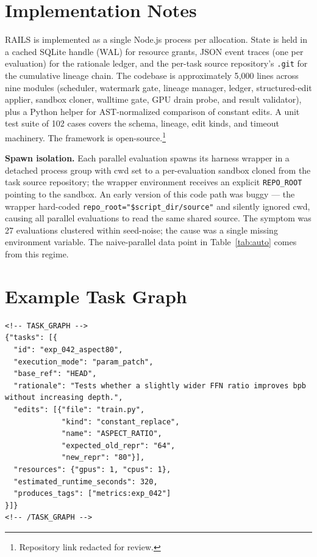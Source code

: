 \documentclass{article}
\newcommand{\rails}{RAILS\xspace}
\begin{document}



\appendix
\section{Implementation Notes}
\label{app:impl}

\rails is implemented as a single Node.js process per allocation. State is held in a cached SQLite handle (WAL) for resource grants, JSON event traces (one per evaluation) for the rationale ledger, and the per-task source repository's \texttt{.git} for the cumulative lineage chain. The codebase is approximately 5{,}000 lines across nine modules (scheduler, watermark gate, lineage manager, ledger, structured-edit applier, sandbox cloner, walltime gate, GPU drain probe, and result validator), plus a Python helper for AST-normalized comparison of constant edits. A unit test suite of 102 cases covers the schema, lineage, edit kinds, and timeout machinery. The framework is open-source.\footnote{Repository link redacted for review.}

\textbf{Spawn isolation.} Each parallel evaluation spawns its harness wrapper in a detached process group with cwd set to a per-evaluation sandbox cloned from the task source repository; the wrapper environment receives an explicit \texttt{REPO\_ROOT} pointing to the sandbox. An early version of this code path was buggy --- the wrapper hard-coded \texttt{repo\_root="\$script\_dir/source"} and silently ignored cwd, causing all parallel evaluations to read the same shared source. The symptom was 27 evaluations clustered within seed-noise; the cause was a single missing environment variable. The naive-parallel data point in Table~\ref{tab:auto} comes from this regime.

\section{Example Task Graph}
\label{app:taskgraph}

\begin{lstlisting}
<!-- TASK_GRAPH -->
{"tasks": [{
  "id": "exp_042_aspect80",
  "execution_mode": "param_patch",
  "base_ref": "HEAD",
  "rationale": "Tests whether a slightly wider FFN ratio improves bpb without increasing depth.",
  "edits": [{"file": "train.py",
             "kind": "constant_replace",
             "name": "ASPECT_RATIO",
             "expected_old_repr": "64",
             "new_repr": "80"}],
  "resources": {"gpus": 1, "cpus": 1},
  "estimated_runtime_seconds": 320,
  "produces_tags": ["metrics:exp_042"]
}]}
<!-- /TASK_GRAPH -->
\end{lstlisting}
\end{document}
